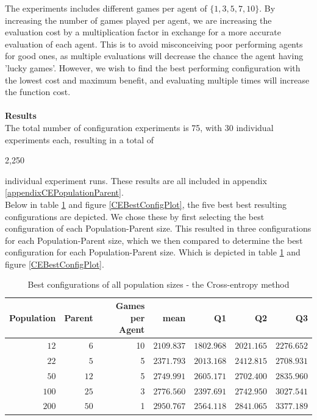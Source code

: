 The experiments includes different games per agent of $\{1,3,5,7,10\}$. By increasing the number of games 
played per agent, we are increasing the evaluation cost by a multiplication factor in exchange for a more 
accurate evaluation of each agent. This is to avoid misconceiving poor performing agents
for good ones, as multiple evaluations will decrease the chance the agent having 
'lucky games'. However, we wish to find 
the best performing configuration with the lowest cost and maximum benefit, and evaluating multiple 
times will increase the function cost.\\
\\
\textbf{Results}\\
The total number of configuration experiments is 75, with 30 individual experiments each,
resulting in a total of
\begin{changebar} 
2,250
\end{changebar} 
individual experiment runs. These results are all included in 
appendix \ref{appendixCEPopulationParent}.\\
Below in table \ref{CEBestConfigTable} and figure \ref{CEBestConfigPlot}, the five best
best resulting configurations are depicted. We chose these by first selecting the best 
configuration of each Population-Parent size. This resulted in three
configurations for each Population-Parent size, which we then compared to determine the best
configuration for each Population-Parent size. Which is depicted in table \ref{CEBestConfigTable} and figure \ref{CEBestConfigPlot}.
\begin{table}[H]
\centering
\small
\begin{tabular}{r r r r r r r}
Population & Parent & Games per Agent & mean & Q1 & Q2 & Q3\\
\hline
$12$ & $6$ & 10 & $2109.837$ & $1802.968$ & $2021.165$ & $2276.652$\\
$22$ & $5$ & 5 & $2371.793$ & $2013.168$ & $2412.815$ & $2708.931$\\
$50$ & $12$ & 5 & $2749.991$ & $2605.171$ & $2702.400$ & $2835.960$\\
$100$ & $25$ & 3 & $2776.560$ & $2397.691$ & $2742.950$ & $3027.541$\\
$200$ & $50$ & 1 & $2950.767$ & $2564.118$ & $2841.065$ & $3377.189$\\
\end{tabular}
\caption{Best configurations of all population sizes - the Cross-entropy method \label{CEBestConfigTable}}
\end{table}

